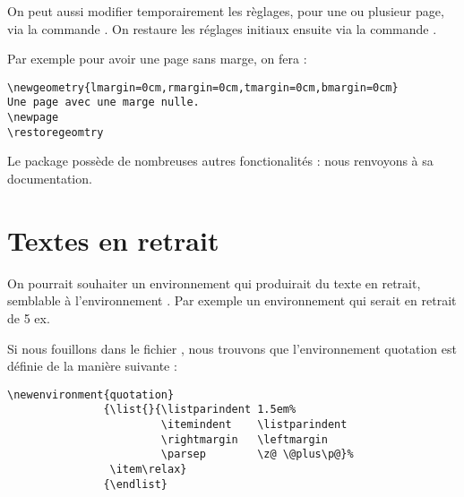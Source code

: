 On peut aussi modifier temporairement les règlages, pour une ou plusieur page, via la commande . On restaure les réglages initiaux ensuite via la commande .

Par exemple pour avoir une page sans marge, on fera :

\begin{verbatim}
\newgeometry{lmargin=0cm,rmargin=0cm,tmargin=0cm,bmargin=0cm}
Une page avec une marge nulle.
\newpage
\restoregeomtry

\end{verbatim}

Le package  possède de nombreuses autres fonctionalités : nous renvoyons à sa documentation.

\section{Textes en retrait}

On pourrait souhaiter un environnement qui produirait du texte en retrait, semblable à l'environnement . Par exemple un environnement  qui serait en retrait de 5 ex.

Si nous fouillons dans le fichier , nous trouvons que l'environnement quotation est définie de la manière suivante :

\begin{verbatim}
\newenvironment{quotation}
               {\list{}{\listparindent 1.5em%
                        \itemindent    \listparindent
                        \rightmargin   \leftmargin
                        \parsep        \z@ \@plus\p@}%
                \item\relax}
               {\endlist}
\end{verbatim}

